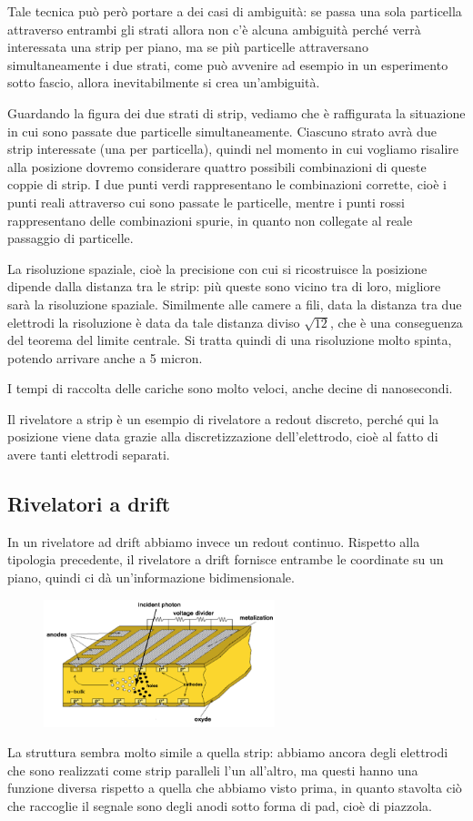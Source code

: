 Tale tecnica può però portare a dei casi di ambiguità: se passa una sola particella attraverso entrambi gli strati allora non c'è alcuna ambiguità perché verrà interessata una strip per piano, ma se più particelle attraversano simultaneamente i due strati, come può avvenire ad esempio in un esperimento sotto fascio, allora inevitabilmente si crea un'ambiguità.

Guardando la figura dei due strati di strip, vediamo che è raffigurata la situazione in cui sono passate due particelle simultaneamente. Ciascuno strato avrà due strip interessate (una per particella), quindi nel momento in cui vogliamo risalire alla posizione dovremo considerare quattro possibili combinazioni di queste coppie di strip. I due punti verdi rappresentano le combinazioni corrette, cioè i punti reali attraverso cui sono passate le particelle, mentre i punti rossi rappresentano delle combinazioni spurie, in quanto non collegate al reale passaggio di particelle. 

La risoluzione spaziale, cioè la precisione con cui si ricostruisce la posizione dipende dalla distanza tra le strip: più queste sono vicino tra di loro, migliore sarà la risoluzione spaziale. Similmente alle camere a fili, data la distanza tra due elettrodi la risoluzione è data da tale distanza diviso $\sqrt{12}$, che è una conseguenza del teorema del limite centrale. Si tratta quindi di una risoluzione molto spinta, potendo arrivare anche a 5 micron.

I tempi di raccolta delle cariche sono molto veloci, anche decine di nanosecondi.

Il rivelatore a strip è un esempio di rivelatore a redout discreto, perché qui la posizione viene data grazie alla discretizzazione dell'elettrodo, cioè al fatto di avere tanti elettrodi separati.

\subsection{Rivelatori a drift}

In un rivelatore ad drift abbiamo invece un redout continuo. Rispetto alla tipologia precedente, il rivelatore a drift fornisce entrambe le coordinate su un piano, quindi ci dà un'informazione bidimensionale.
\begin{figure}[H]
   \centering
   \includegraphics[width=0.6\textwidth]{immagini/rivelatori_a_drift.png}
\end{figure}
La struttura sembra molto simile a quella strip: abbiamo ancora degli elettrodi che sono realizzati come strip paralleli l'un all'altro, ma questi hanno una funzione diversa rispetto a quella che abbiamo visto prima, in quanto stavolta ciò che raccoglie il segnale sono degli anodi sotto forma di pad, cioè di piazzola.

